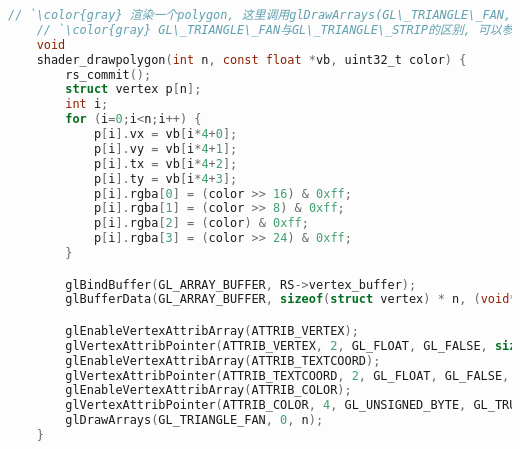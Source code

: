 {\begin{lstlisting}[language=C]
    // `\color{gray} 渲染一个polygon, 这里调用glDrawArrays(GL\_TRIANGLE\_FAN, ...)来实现绘制`
    // `\color{gray} GL\_TRIANGLE\_FAN与GL\_TRIANGLE\_STRIP的区别, 可以参考\href{http://blog.csdn.net/xiajun07061225/article/details/7455283}{这篇文章}`
    void
    shader_drawpolygon(int n, const float *vb, uint32_t color) {
        rs_commit();
        struct vertex p[n];
        int i;
        for (i=0;i<n;i++) {
            p[i].vx = vb[i*4+0];
            p[i].vy = vb[i*4+1];
            p[i].tx = vb[i*4+2];
            p[i].ty = vb[i*4+3];
            p[i].rgba[0] = (color >> 16) & 0xff;
            p[i].rgba[1] = (color >> 8) & 0xff;
            p[i].rgba[2] = (color) & 0xff;
            p[i].rgba[3] = (color >> 24) & 0xff;
        }

        glBindBuffer(GL_ARRAY_BUFFER, RS->vertex_buffer);
        glBufferData(GL_ARRAY_BUFFER, sizeof(struct vertex) * n, (void*)p, GL_DYNAMIC_DRAW);

        glEnableVertexAttribArray(ATTRIB_VERTEX);
        glVertexAttribPointer(ATTRIB_VERTEX, 2, GL_FLOAT, GL_FALSE, sizeof(struct vertex), BUFFER_OFFSET(0));
        glEnableVertexAttribArray(ATTRIB_TEXTCOORD);
        glVertexAttribPointer(ATTRIB_TEXTCOORD, 2, GL_FLOAT, GL_FALSE, sizeof(struct vertex), BUFFER_OFFSET(8));
        glEnableVertexAttribArray(ATTRIB_COLOR);
        glVertexAttribPointer(ATTRIB_COLOR, 4, GL_UNSIGNED_BYTE, GL_TRUE, sizeof(struct vertex), BUFFER_OFFSET(16));
        glDrawArrays(GL_TRIANGLE_FAN, 0, n);
    }

    \end{lstlisting}
}

